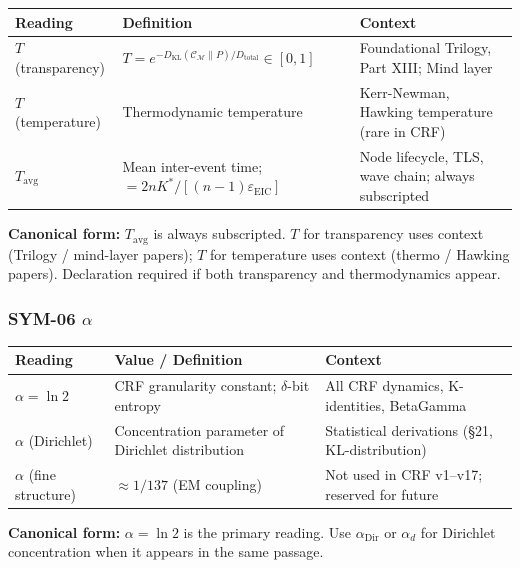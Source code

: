 \documentclass[12pt, a4paper]{article}
\begin{document}
\begin{yellowbox}[title={SYM-05 \textmd{---} $T$ \textmd{(three readings)}}]
\renewcommand{\arraystretch}{1.35}
\begin{tabular}{p{2.8cm} p{4.5cm} p{4.5cm}}
\toprule
\textbf{Reading} & \textbf{Definition} & \textbf{Context}\\
\midrule
$T$ (transparency) &
  $T = e^{-D_{\text{KL}}(\mathcal{C}_\mathcal{M}\|P)/D_{\text{total}}}
  \in[0,1]$ &
  Foundational Trilogy, Part XIII; Mind layer\\
$T$ (temperature) &
  Thermodynamic temperature &
  Kerr-Newman, Hawking temperature (rare in CRF)\\
$T_{\text{avg}}$ &
  Mean inter-event time; $= 2nK^*/[(n-1)\varepsilon_{\text{EIC}}]$ &
  Node lifecycle, TLS, wave chain; always subscripted\\
\bottomrule
\end{tabular}

\medskip
\textbf{Canonical form:} $T_{\text{avg}}$ is always subscripted.
$T$ for transparency uses context (Trilogy / mind-layer papers);
$T$ for temperature uses context (thermo / Hawking papers).
Declaration required if both transparency and thermodynamics appear.
\end{yellowbox}

\subsubsection*{SYM-06 \quad $\alpha$}

\begin{yellowbox}[title={SYM-06 \textmd{---} $\alpha$ \textmd{(three readings)}}]
\renewcommand{\arraystretch}{1.35}
\begin{tabular}{p{2.8cm} p{4.5cm} p{4.5cm}}
\toprule
\textbf{Reading} & \textbf{Value / Definition} & \textbf{Context}\\
\midrule
$\alpha = \ln 2$ &
  CRF granularity constant; $\delta$-bit entropy &
  All CRF dynamics, K-identities, BetaGamma\\
$\alpha$ (Dirichlet) &
  Concentration parameter of Dirichlet distribution &
  Statistical derivations (\S21, KL-distribution)\\
$\alpha$ (fine structure) &
  $\approx 1/137$ (EM coupling) &
  Not used in CRF v1--v17; reserved for future\\
\bottomrule
\end{tabular}

\medskip
\textbf{Canonical form:} $\alpha = \ln 2$ is the primary reading.
Use $\alpha_{\text{Dir}}$ or $\alpha_d$ for Dirichlet concentration
when it appears in the same passage.
\end{yellowbox}
\end{document}

